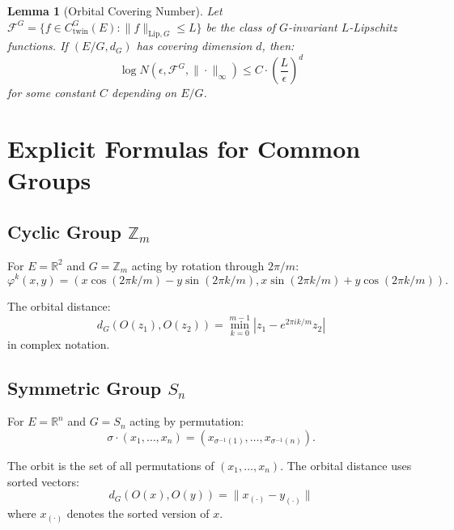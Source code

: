 \documentclass[11pt]{article}
\newtheorem{lemma}[theorem]{Lemma}
\newcommand{\R}{\mathbb{R}}
\newcommand{\Z}{\mathbb{Z}}
\begin{document}
\begin{lemma}[Orbital Covering Number]\label{lem:orbital_covering}
Let $\mathcal{F}^G = \{f \in C_{\mathrm{twin}}^G(E) : \|f\|_{\mathrm{Lip},G} \leq L\}$ be the class of $G$-invariant $L$-Lipschitz functions. If $(E/G, d_G)$ has covering dimension $d$, then:
\begin{equation}\label{eq:covering_bound}
\log N(\epsilon, \mathcal{F}^G, \|\cdot\|_\infty) \leq C \cdot \left( \frac{L}{\epsilon} \right)^d
\end{equation}
for some constant $C$ depending on $E/G$.
\end{lemma}

\section{Explicit Formulas for Common Groups}

\subsection{Cyclic Group $\Z_m$}

For $E = \R^2$ and $G = \Z_m$ acting by rotation through $2\pi/m$:
\begin{equation}\label{eq:cyclic_action}
\varphi^k(x, y) = (x \cos(2\pi k/m) - y \sin(2\pi k/m), x \sin(2\pi k/m) + y \cos(2\pi k/m)).
\end{equation}

The orbital distance:
\begin{equation}\label{eq:cyclic_distance}
d_G(O(z_1), O(z_2)) = \min_{k=0}^{m-1} |z_1 - e^{2\pi i k/m} z_2|
\end{equation}
in complex notation.

\subsection{Symmetric Group $S_n$}

For $E = \R^n$ and $G = S_n$ acting by permutation:
\begin{equation}\label{eq:symmetric_action}
\sigma \cdot (x_1, \ldots, x_n) = (x_{\sigma^{-1}(1)}, \ldots, x_{\sigma^{-1}(n)}).
\end{equation}

The orbit is the set of all permutations of $(x_1, \ldots, x_n)$. The orbital distance uses sorted vectors:
\begin{equation}\label{eq:symmetric_distance}
d_G(O(x), O(y)) = \|x_{(\cdot)} - y_{(\cdot)}\|
\end{equation}
where $x_{(\cdot)}$ denotes the sorted version of $x$.
\end{document}
